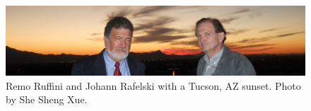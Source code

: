 \documentclass[universe,article,submit,moreauthors,pdftex,a4paper]{Definitions/mdpi}
\begin{document}

\begin{figure}[H]
\centering
\includegraphics[width=\linewidth]{./remo_sunset}
\caption{Remo Ruffini and Johann Rafelski with a Tucson, AZ sunset. Photo by She Sheng Xue.}
\label{remo_sunset} 
\end{figure}
\end{document}
